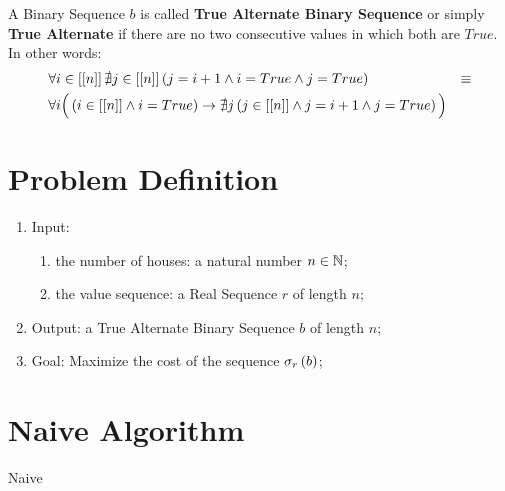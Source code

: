 \begin{defn}
    A Binary Sequence $b$ is called \textbf{True Alternate Binary Sequence} or simply \textbf{True Alternate} if there are no two consecutive values in which both are $True$. In other words:
    \begin{align}
        & \forall i \in \range{n} \nexists j \in \range{n} \left(
            j = i + 1
            \land
            i = True
            \land
            j = True
        \right)
        & \equiv \\\nonumber
        &
        \forall i \Big(
            \left(i \in \range{n} \land i = True\right)
            \rightarrow
            \nexists j \left(
                j \in \range{n}
                \land
                j = i + 1
                \land
                j = True
            \right)
        \Big) &
    \end{align}
\end{defn}

\section{Problem Definition}

\begin{enumerate}
    \item Input:
    \begin{enumerate}
        \item the number of houses: a natural number $n \in \N$;
        \item the value sequence: a Real Sequence $r$ of length $n$;
    \end{enumerate}
    \item Output: a True Alternate Binary Sequence $b$ of length $n$;
    \item Goal: Maximize the cost of the sequence $\cost{b}{r}$;
\end{enumerate}

\section{Naive Algorithm}

\begin{algorithm}[H]
    \caption{Naive}
    \label{burglar's-night-out:algorithm:naive}
    \begin{algorithmic}[1]
    \end{algorithmic}
\end{algorithm}
